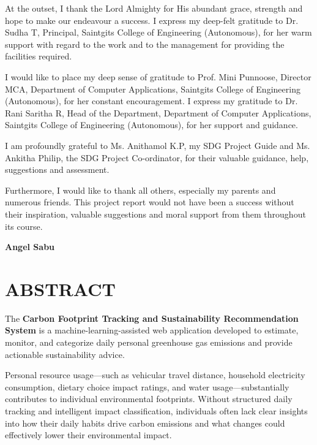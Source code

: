 \documentclass[12pt,a4paper]{report}
\begin{document}
At the outset, I thank the Lord Almighty for His abundant grace, strength and hope to make our endeavour a success. I express my deep-felt gratitude to Dr. Sudha T, Principal, Saintgits College of Engineering (Autonomous), for her warm support with regard to the work and to the management for providing the facilities required.

I would like to place my deep sense of gratitude to Prof. Mini Punnoose, Director MCA, Department of Computer Applications, Saintgits College of Engineering (Autonomous), for her constant encouragement. I express my gratitude to Dr. Rani Saritha R, Head of the Department, Department of Computer Applications, Saintgits College of Engineering (Autonomous), for her support and guidance.

I am profoundly grateful to Ms. Anithamol K.P, my SDG Project Guide and Ms. Ankitha Philip, the SDG Project Co-ordinator, for their valuable guidance, help, suggestions and assessment.

Furthermore, I would like to thank all others, especially my parents and numerous friends. This project report would not have been a success without their inspiration, valuable suggestions and moral support from them throughout its course.

\vspace{2.0cm}
\noindent \hfill \textbf{Angel Sabu}

\clearpage
\chapter*{ABSTRACT}

The \textbf{Carbon Footprint Tracking and Sustainability Recommendation System} is a machine-learning-assisted web application developed to estimate, monitor, and categorize daily personal greenhouse gas emissions and provide actionable sustainability advice.

Personal resource usage---such as vehicular travel distance, household electricity consumption, dietary choice impact ratings, and water usage---substantially contributes to individual environmental footprints. Without structured daily tracking and intelligent impact classification, individuals often lack clear insights into how their daily habits drive carbon emissions and what changes could effectively lower their environmental impact.
\end{document}
